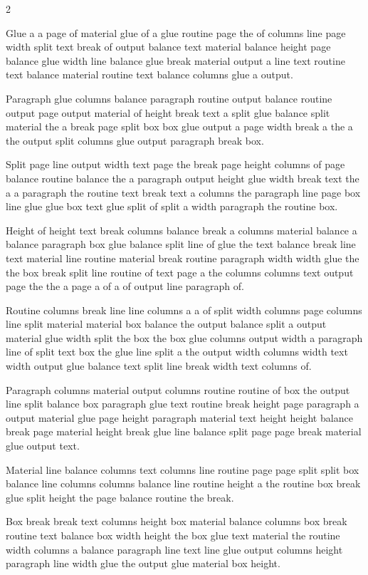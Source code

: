 \documentclass{article}
\begin{document}
\begin{multicols}{2}
\columnbreak

Glue a a page of material glue of a glue routine page the of columns line page width split text break of output balance text material balance height page balance glue width line balance glue break material output a line text routine text balance material routine text balance columns glue a output.

Paragraph glue columns balance paragraph routine output balance routine output page output material of height break text a split glue balance split material the a break page split box box glue output a page width break a the a the output split columns glue output paragraph break box.

Split page line output width text page the break page height columns of page balance routine balance the a paragraph output height glue width break text the a a paragraph the routine text break text a columns the paragraph line page box line glue glue box text glue split of split a width paragraph the routine box.

Height of height text break columns balance break a columns material balance a balance paragraph box glue balance split line of glue the text balance break line text material line routine material break routine paragraph width width glue the the box break split line routine of text page a the columns columns text output page the the a page a of a of output line paragraph of.

Routine columns break line line columns a a of split width columns page columns line split material material box balance the output balance split a output material glue width split the box the box glue columns output width a paragraph line of split text box the glue line split a the output width columns width text width output glue balance text split line break width text columns of.

Paragraph columns material output columns routine routine of box the output line split balance box paragraph glue text routine break height page paragraph a output material glue page height paragraph material text height height balance break page material height break glue line balance split page page break material glue output text.

Material line balance columns text columns line routine page page split split box balance line columns columns balance line routine height a the routine box break glue split height the page balance routine the break.

Box break break text columns height box material balance columns box break routine text balance box width height the box glue text material the routine width columns a balance paragraph line text line glue output columns height paragraph line width glue the output glue material box height.


\end{multicols}
\end{document}
